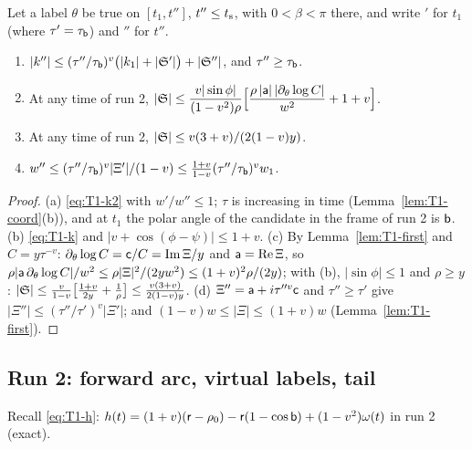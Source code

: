 \begin{lemma}\label{lem:HTp-twotime}
Let a label $\theta$ be true on $[t_1,t'']$, $t''\le t_{\mathrm s}$, with $0<\beta<\pi$ there, and write $'$ for $t_1$ (where $\tau'=\tau_{\mathsf b}$)
and $''$ for $t''$.
\begin{enumerate}
\item[(a)] $|k''|\le(\tau''/\tau_{\mathsf b})^v\bigl(|k_1|+|\mathfrak S'|\bigr)+|\mathfrak S''|$, and $\tau''\ge\tau_{\mathsf b}$.
\item[(b)] At any time of run 2, $|\mathfrak S|\le\dfrac{v|\sin\phi|}{(1-v^2)\rho}\Bigl[\dfrac{\rho\,|\mathsf a|\,|\partial_\theta\log C|}{w^2}+1+v\Bigr]$.
\item[(c)] At any time of run 2, $|\mathfrak S|\le v(3+v)/(2(1-v)y)$.
\item[(d)] $w''\le(\tau''/\tau_{\mathsf b})^v|\Xi'|/(1-v)\le\frac{1+v}{1-v}(\tau''/\tau_{\mathsf b})^vw_1$.
\end{enumerate}
\end{lemma}
\begin{proof}
(a) \eqref{eq:T1-k2} with $w'/w''\le1$; $\tau$ is increasing in time (Lemma~\ref{lem:T1-coord}(b)), and at $t_1$ the polar angle of the
candidate in the frame of run 2 is $\mathsf b$. (b) \eqref{eq:T1-k} and $|v+\cos(\phi-\psi)|\le1+v$. (c) By Lemma~\ref{lem:T1-first} and
$C=y\tau^{-v}$: $\partial_\theta\log C=\mathsf c/C=\operatorname{Im}\Xi/y$ and $\mathsf a=\operatorname{Re}\Xi$, so
$\rho|\mathsf a\,\partial_\theta\log C|/w^2\le\rho|\Xi|^2/(2yw^2)\le(1+v)^2\rho/(2y)$; with (b), $|\sin\phi|\le1$ and $\rho\ge y$:
$|\mathfrak S|\le\frac v{1-v}\bigl[\frac{1+v}{2y}+\frac1\rho\bigr]\le\frac{v(3+v)}{2(1-v)y}$. (d) $\Xi''=\mathsf a+i\tau''^v\mathsf c$ and
$\tau''\ge\tau'$ give $|\Xi''|\le(\tau''/\tau')^v|\Xi'|$; and $(1-v)w\le|\Xi|\le(1+v)w$ (Lemma~\ref{lem:T1-first}).
\end{proof}

\subsection{Run 2: forward arc, virtual labels, tail}\label{sec:HTp-run2}

Recall \eqref{eq:T1-h}: $h(t)=(1+v)(\mathsf r-\rho_0)-\mathsf r(1-\cos\mathsf b)+(1-v^2)\omega(t)$ in run 2 (exact).

